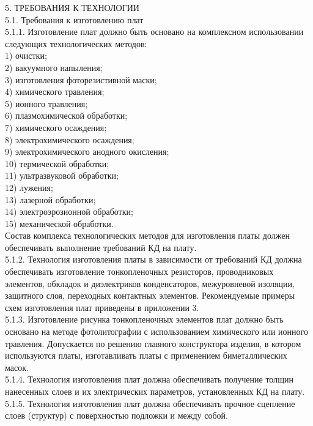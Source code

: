 \documentclass{bmstu}
\begin{document}
	5. ТРЕБОВАНИЯ К ТЕХНОЛОГИИ \\
	5.1. Требования к изготовлению плат \\
	5.1.1. Изготовление плат должно быть основано на комплексном использовании следующих технологических методов: \\
	1) очистки; \\
	2) вакуумного напыления; \\
	3) изготовления фоторезистивной маски; \\
	4) химического травления; \\
	5) ионного травления; \\
	6) плазмохимической обработки; \\
	7) химического осаждения; \\
	8) электрохимического осаждения; \\
	9) электрохимического анодного окисления; \\
	10) термической обработки; \\
	11) ультразвуковой обработки; \\
	12) лужения; \\
	13) лазерной обработки; \\
	14) электроэрозионной обработки; \\
	15) механической обработки. \\
	Состав комплекса технологических методов для изготовления платы должен обеспечивать выполнение требований КД на плату. \\
	5.1.2. Технология изготовления платы в зависимости от требований КД должна обеспечивать изготовление тонкопленочных резисторов, проводниковых элементов, обкладок и диэлектриков конденсаторов, межуровневой изоляции, защитного слоя, переходных контактных элементов. Рекомендуемые примеры схем изготовления плат приведены в приложении 3. \\
	5.1.3. Изготовление рисунка тонкопленочных элементов плат должно быть основано на методе фотолитографии с использованием химического или ионного травления.
	Допускается по решению главного конструктора изделия, в котором используются платы, изготавливать платы с применением биметаллических масок. \\
	5.1.4. Технология изготовления плат должна обеспечивать получение толщин нанесенных слоев и их электрических параметров, установленных КД на плату. \\
	5.1.5. Технология изготовления плат должна обеспечивать прочное сцепление слоев (структур) с поверхностью подложки и между собой. \\
\end{document}
